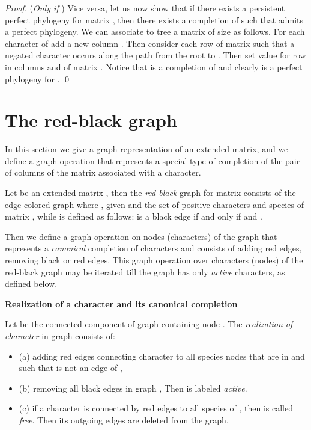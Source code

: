 \documentclass{llncs}
\newcommand{\grb}{ }
\newcommand{\grbc}{, }
\begin{document}
\begin{proof}
 


({\em Only if }) Vice versa, let us now show that if there exists a persistent perfect phylogeny  for matrix , then there exists a completion  of  such that  admits a perfect phylogeny.
We can associate to tree  a matrix  of size  as follows.
  For each  character  of  add a new column . Then consider each row  of matrix  such that
   a negated character  occurs along the path from the root to . Then set  value  for row    in columns   and  of matrix .
Notice that   is a completion of  and clearly  is a perfect phylogeny for . 
\qed
\end{proof}






\section{The red-black graph}
\label{section-graph}

 
In this section  we give a graph representation of  an extended matrix, and we define a graph operation that represents  a special type of completion of  the pair of  columns of the matrix associated with a  character.  


Let  be an extended matrix , then  the {\em red-black} graph  for matrix  consists of the edge colored graph  where ,  given  and  the set of positive characters and species of matrix , while  is defined as follows:
 is a black edge  if and only if  and .




 




Then we define a graph operation  on nodes (characters) of the graph \grb that represents a {\em canonical} completion of characters  and consists of adding red edges, removing black or red edges. 
This  graph  operation  over characters (nodes)  of  the red-black graph may be iterated till the graph has only {\em active} characters, as defined below.




\noindent
{\bf Realization of a character   and its canonical completion}

Let    be the connected component of graph \grb containing node .  The {\it realization of   character }  in graph \grb  consists of:

\begin{itemize}



 \item  (a) adding  red edges connecting character  to all species nodes  that are in  and such that  is not an edge of \grbc
  
   \item

  (b) removing  all black edges  in graph \grbc  Then  is labeled {\em active}.
  
  \item (c) if  a character  is connected by red edges to all species of ,  then   is called  {\em free}.  Then its outgoing edges are deleted from the graph.  
 
 \end{itemize}
 
\end{document}

